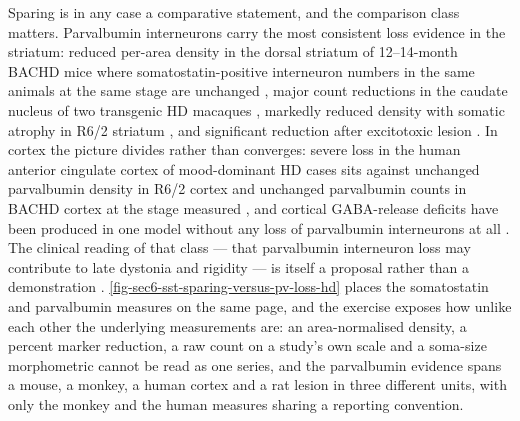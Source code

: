\documentclass[11pt]{article}
\begin{document}
Sparing is in any case a comparative statement, and the comparison class matters. Parvalbumin interneurons carry the most consistent loss evidence in the striatum: reduced per-area density in the dorsal striatum of 12--14-month BACHD mice where somatostatin-positive interneuron numbers in the same animals at the same stage are unchanged \citep{Rallapalle2021}, major count reductions in the caudate nucleus of two transgenic HD macaques \citep{Lallani2019}, markedly reduced density with somatic atrophy in R6/2 striatum \citep{Paldino2017}, and significant reduction after excitotoxic lesion \citep{Feng2014}. In cortex the picture divides rather than converges: severe loss in the human anterior cingulate cortex of mood-dominant HD cases \citep{Kim2014} sits against unchanged parvalbumin density in R6/2 cortex and unchanged parvalbumin counts in BACHD cortex at the stage measured \citep{Voelkl2022,Molero2026}, and cortical GABA-release deficits have been produced in one model without any loss of parvalbumin interneurons at all \citep{Dougherty2014}. The clinical reading of that class --- that parvalbumin interneuron loss may contribute to late dystonia and rigidity --- is itself a proposal rather than a demonstration \citep{Reiner2018}. \ref{fig-sec6-sst-sparing-versus-pv-loss-hd} places the somatostatin and parvalbumin measures on the same page, and the exercise exposes how unlike each other the underlying measurements are: an area-normalised density, a percent marker reduction, a raw count on a study's own scale and a soma-size morphometric cannot be read as one series, and the parvalbumin evidence spans a mouse, a monkey, a human cortex and a rat lesion in three different units, with only the monkey and the human measures sharing a reporting convention.
\end{document}
